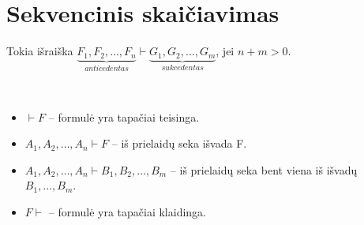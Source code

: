 \chapter{Sekvencinis skaičiavimas}

\begin{defn}[Sekvencija]
  Tokia išraiška $\underbrace{F_{1},F_{2},\dots,F_{n}}_{anticedentas}%
  \vdash \underbrace{G_{1},G_{2},\dots,G_{m}}_{sukcedentas}$, jei 
  \mbox{$n + m > 0$}.
  \begin{note}
    \hfill \\
    \begin{itemize}
      \item $\vdash F$ – formulė yra tapačiai teisinga.
      \item $A_{1},A_{2},\dots,A_{n} \vdash F$ – iš prielaidų seka išvada F.
      \item $A_{1},A_{2},\dots,A_{n} \vdash B_{1},B_{2},\dots,B_{m}$ – iš 
        prielaidų seka bent viena iš išvadų $B_{1},\dots,B_{m}$.
      \item $F \vdash$ – formulė yra tapačiai klaidinga.
    \end{itemize} 
  \end{note}
\end{defn}

